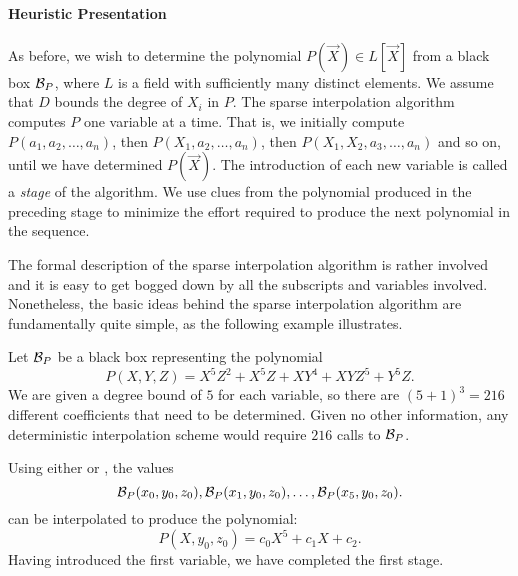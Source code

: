 \paragraph{Heuristic Presentation}

As before, we wish to determine the polynomial $P(\vec X) \in L[\vec
X]$ from a black box ${\cal B}_P$, where $L$ is a field with
sufficiently many distinct elements.  We assume that $D$ bounds the
degree of $X_i$ in $P$.  The sparse interpolation algorithm computes
$P$ one variable at a time.  That is, we initially compute $P(a_1,
a_2, \ldots, a_n)$, then $P(X_1, a_2, \ldots,a_n)$, then $P(X_1, X_2,
a_3, \ldots, a_n)$ and so on, until we have determined $P(\vec X)$.
The introduction of each new variable is called a {\em stage} of the
algorithm.  We use clues from the 
polynomial produced in the preceding stage to minimize the effort 
required to produce the next polynomial in the sequence. 

The formal description of the sparse interpolation algorithm is rather
involved and it is easy to get bogged down by all the subscripts and
variables involved.  Nonetheless, the basic ideas behind the sparse
interpolation algorithm are fundamentally quite simple, as the
following example illustrates.

Let ${\cal B}_P$ be a black box representing the polynomial
\[
P(X, Y, Z) = 
  X^5 Z^2 + X^5 Z + X Y^4 + X Y Z^5 + Y^5 Z.
\]
We are given a degree bound of $5$ for each variable, so there are
$(5+1)^3 = 216$ different coefficients that need to be determined.
Given no other information, any deterministic interpolation scheme
would require $216$ calls to ${\cal B}_P$.  

Using either  or , the values
\[
{\cal B}_P(x_0, y_0, z_0), {\cal B}_P(x_1, y_0, z_0), \ldots, 
{\cal B}_P(x_5, y_0, z_0).
\]
can be interpolated to produce the polynomial:
\[
P(X, y_0, z_0) = c_0 X^5 + c_1 X + c_2.
\]
Having introduced the first variable, we have completed the first
stage.

